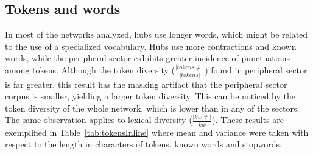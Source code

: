 																																												\subsection{Tokens and words}\label{subsec:tw}

																																												In most of the networks analyzed, hubs use longer words, which might be related to the use of a specialized vocabulary.
																																												Hubs use more contractions and known words, while the peripheral sector exhibits greater incidence of punctuations among tokens.
																																												Although the token diversity ($\frac{|tokens \neq|}{|tokens|}$) found in peripheral sector is far greater,
																																												this result has the masking artifact that the peripheral sector corpus is smaller, yielding a larger token diversity.
																																												This can be noticed by the token diversity of the whole network, which is lower than in any of the sectors.
																																												The same observation applies to lexical diversity ($\frac{|kw\neq|}{kw}$).
																																												These results are exemplified in Table~\ref{tab:tokensInline}
																																												where mean and variance were taken with respect to the length in characters of tokens, known words and stopwords.
																																												
																																												\FloatBarrier


